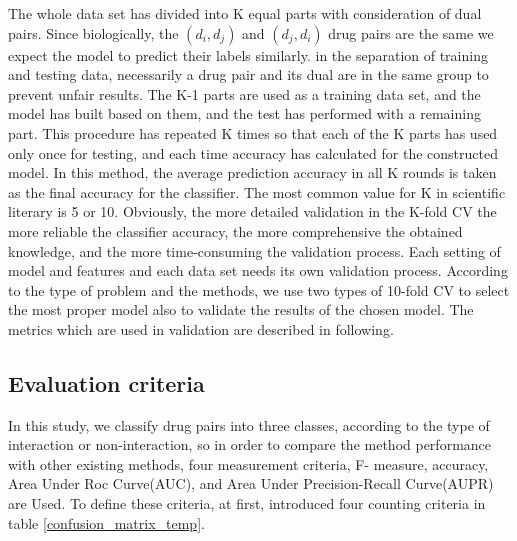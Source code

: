 \documentclass{bmcart}
\begin{document}
The whole data set has divided into K equal parts with consideration of dual pairs. Since biologically, the $(d_i, d_j)$ and $(d_j, d_i)$ drug pairs are the same we expect the model to predict their labels similarly.  in the separation of training and testing data, necessarily a drug pair and its dual are in the same group to prevent unfair results. The K-1 parts are used as a training data set, and the model has built based on them, and the test has performed with a remaining part. This procedure has repeated K times so that each of the K parts has used only once for testing, and each time accuracy has calculated for the constructed model. In this method, the average prediction accuracy in all K rounds is taken as the final accuracy for the classifier. The most common value for K in scientific literary is 5 or 10. Obviously, the more detailed validation in the K-fold CV the more reliable the classifier accuracy, the more comprehensive the obtained knowledge, and the more time-consuming the validation process. Each setting of model and features and each data set needs its own validation process. According to the type of problem and the methods, we use two types of 10-fold CV to select the most proper model also to validate the results of the chosen model. The metrics which are used in validation are described in following.

\subsection*{Evaluation criteria}
In this study, we classify drug pairs into three classes, according to the type of interaction or non-interaction, so in order to compare the method performance with other existing methods, four measurement criteria, F- measure, accuracy, Area Under Roc Curve(AUC), and Area Under Precision-Recall Curve(AUPR) are Used. To define these criteria, at first, introduced four counting criteria in table
\ref{confusion_matrix_temp}.
\end{document}

